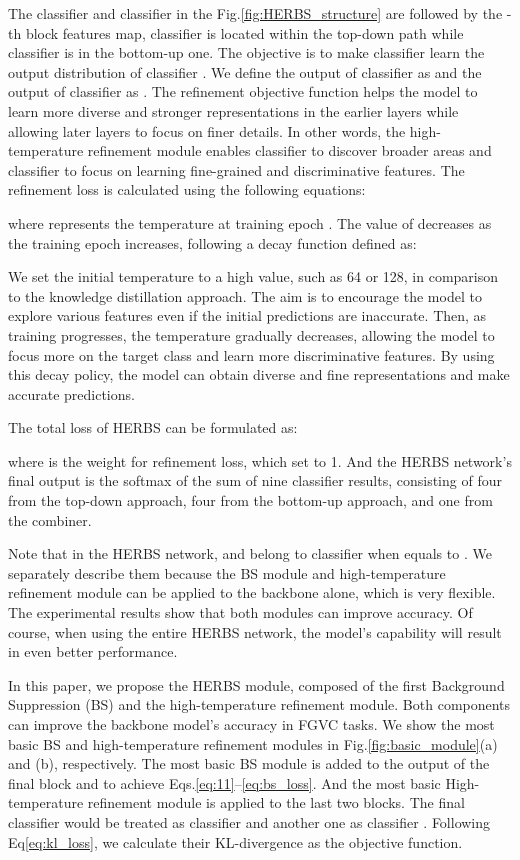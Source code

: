 \documentclass[journal]{IEEEtran}
\begin{document}
The classifier  and classifier  in the Fig.\ref{fig:HERBS_structure} are followed by the -th block features map, classifier  is located within the top-down path while classifier  is in the bottom-up one. The objective is to make classifier  learn the output distribution of classifier . We define the output of classifier  as  and the output of classifier  as . The refinement objective function helps the model to learn more diverse and stronger representations in the earlier layers while allowing later layers to focus on finer details. In other words, the high-temperature refinement module enables classifier  to discover broader areas and classifier  to focus on learning fine-grained and discriminative features. The refinement loss is calculated using the following equations:



where  represents the temperature at training epoch . The value of  decreases as the training epoch increases, following a decay function defined as:


We set the initial temperature  to a high value, such as 64 or 128, in comparison to the knowledge distillation approach\cite{KD}. The aim is to encourage the model to explore various features even if the initial predictions are inaccurate. Then, as training progresses, the temperature gradually decreases, allowing the model to focus more on the target class and learn more discriminative features. By using this decay policy, the model can obtain diverse and fine representations and make accurate predictions.

The total loss of HERBS can be formulated as:

where  is the weight for refinement loss, which set to 1. And the HERBS network's final output is the softmax of the sum of nine classifier results, consisting of four from the top-down approach, four from the bottom-up approach, and one from the combiner.

Note that in the HERBS network,  and  belong to classifier  when  equals to . We separately describe them because the BS module and high-temperature refinement module can be applied to the backbone alone, which is very flexible. The experimental results show that both modules can improve accuracy. Of course, when using the entire HERBS network, the model's capability will result in even better performance.

In this paper, we propose the HERBS module, composed of the first Background Suppression (BS) and the high-temperature refinement module. Both components can improve the backbone model's accuracy in FGVC tasks. We show the most basic BS and high-temperature refinement modules in Fig.\ref{fig:basic_module}(a) and (b), respectively. The most basic BS module is added to the output of the final block and to achieve Eqs.\eqref{eq:11}--\eqref{eq:bs_loss}. And the most basic High-temperature refinement module is applied to the last two blocks. The final classifier would be treated as classifier  and another one as classifier . Following Eq\ref{eq:kl_loss}, we calculate their KL-divergence as the objective function.
\end{document}

